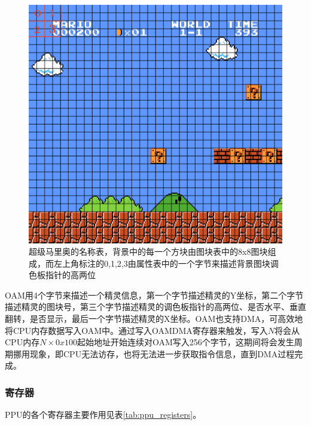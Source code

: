 \documentclass[a4paper]{ltxdoc}
\begin{document}
{\begin{figure}[h]
	\centering
	\includegraphics[width=\textwidth]{images/nametable.png}
	\caption[超级马里奥的名称表]{超级马里奥的名称表，背景中的每一个方块由图块表中的8x8图块组成，而左上角标注的0,1,2,3由属性表中的一个字节来描述背景图块调色板指针的高两位}
	\label{fig:nametable}
\end{figure}


OAM用4个字节来描述一个精灵信息，第一个字节描述精灵的Y坐标，第二个字节描述精灵的图块号，第三个字节描述精灵的调色板指针的高两位、是否水平、垂直翻转，是否显示，最后一个字节描述精灵的X坐标。OAM也支持DMA，可高效地将CPU内存数据写入OAM中。通过写入OAMDMA寄存器来触发，写入$N$将会从CPU内存$N\times 0x100$起始地址开始连续对OAM写入256个字节，这期间将会发生周期挪用现象，即CPU无法访存，也将无法进一步获取指令信息，直到DMA过程完成。

\subsubsection{寄存器}
PPU的各个寄存器主要作用见表\ref{tab:ppu_registers}。

}
\end{document}
